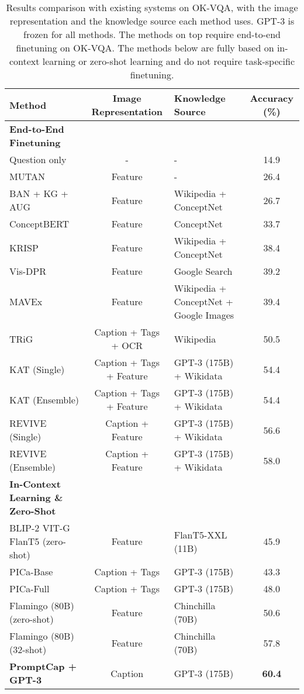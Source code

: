 \documentclass[10pt,twocolumn,letterpaper]{article}
\begin{document}
 

\begin{table*}[h]
\small
\centering
\caption{
\label{tab:okvqa}
Results comparison with existing systems on OK-VQA, with the image representation and the knowledge source each method uses.
GPT-3 is frozen for all methods.  The methods on top require end-to-end finetuning on OK-VQA. The methods below are fully based on in-context learning or zero-shot learning and do not require task-specific finetuning.
}
\begin{tabular}{l|c|l|c}
\toprule[1.2pt]
Method & Image Representation & Knowledge Source & Accuracy (\%)\\
\midrule
\textbf{End-to-End Finetuning}\\
Question only \cite{marino2019ok} & - & - & 14.9 \\
MUTAN \cite{marino2019okvqa} & Feature & - & 26.4 \\
BAN + KG + AUG \cite{Li2020BoostingVQ} & Feature & Wikipedia + ConceptNet & 26.7 \\
ConceptBERT \cite{garderes2020conceptbert} &  Feature & ConceptNet & 33.7\\
KRISP \cite{marino2021krisp} &  Feature & Wikipedia + ConceptNet & 38.4 \\
Vis-DPR \cite{luo2021weakly}  &  Feature  & Google Search  & 39.2 \\
MAVEx \cite{wu2022multi} & Feature & Wikipedia + ConceptNet + Google Images & 39.4  \\
TRiG \cite{Gao_2022_CVPR} & Caption + Tags + OCR & Wikipedia & 50.5 \\
KAT (Single) \cite{gui2022kat} & Caption + Tags + Feature & GPT-3 (175B) + Wikidata & 54.4   \\
KAT (Ensemble) \cite{gui2022kat} & Caption + Tags + Feature & GPT-3 (175B) + Wikidata & 54.4   \\
REVIVE (Single) \cite{Lin2022REVIVERV} & Caption + Feature & GPT-3 (175B) + Wikidata & 56.6 \\
REVIVE (Ensemble) \cite{Lin2022REVIVERV} & Caption + Feature & GPT-3 (175B) + Wikidata & 58.0 \\
\midrule
\textbf{In-Context Learning \& Zero-Shot} \\
BLIP-2 VIT-G FlanT5 \cite{Li2023BLIP2BL} (zero-shot) & Feature & FlanT5-XXL (11B) & 45.9 \\
PICa-Base \cite{yang2022empirical} & Caption + Tags &  GPT-3 (175B) & 43.3   \\
PICa-Full \cite{yang2022empirical} & Caption + Tags &  GPT-3 (175B) & 48.0   \\
Flamingo (80B) \cite{alayrac2022flamingo} (zero-shot) & Feature & Chinchilla (70B) & 50.6 \\
Flamingo (80B) \cite{alayrac2022flamingo} (32-shot) & Feature &  Chinchilla (70B) & 57.8 \\ 
\textbf{PromptCap + GPT-3} & Caption  & GPT-3 (175B) & \textbf{60.4} \\
\bottomrule[1.2pt]
\end{tabular}


\end{table*}
\end{document}
